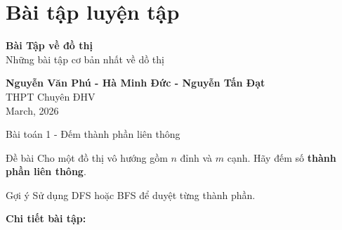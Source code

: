 \documentclass{beamer}
\begin{document}
\section{Bài tập luyện tập}

\begin{frame}[plain]
    \centering
    \vspace{1cm}

    \begin{tcolorbox}[
            enhanced,
            colback=blue!70!black,
            colframe=blue!70!black,
            width=0.75\textwidth,
            arc=4mm,
            boxrule=0pt,
            drop shadow
        ]
        \centering
        {\color{white}\LARGE \textbf{Bài Tập về đồ thị}}\\[0.2cm]
        {\color{white}\large Những bài tập cơ bản nhất về dồ thị}
    \end{tcolorbox}

    \vspace{1.2cm}

    {\Large \textbf{Nguyễn Văn Phú - Hà Minh Đức - Nguyễn Tấn Đạt}}\\[0.4cm]
    THPT Chuyên ĐHV\\[0.6cm]

    March, 2026
\end{frame}

\begin{frame}{Bài toán 1 - Đếm thành phần liên thông}

\begin{block}{Đề bài}
Cho một đồ thị vô hướng gồm $n$ đỉnh và $m$ cạnh.  
Hãy đếm số \textbf{thành phần liên thông}.
\end{block}

\pause

\begin{alertblock}{Gợi ý}
Sử dụng DFS hoặc BFS để duyệt từng thành phần.
\end{alertblock}

\pause

\begin{center}
\textbf{Chi tiết bài tập:}

\vspace{0.3cm}

\href{https://codeforces.com/problemset/problem/166/A}{\color{blue}{Click vào đây}}
\end{center}

\end{frame}
\end{document}
